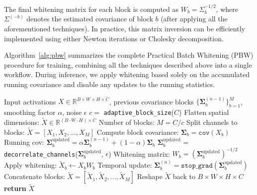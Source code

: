 The final whitening matrix for each block is computed as $W_b = \Sigma_b^{-1/2}$, where $\Sigma^{(-b)}$ denotes the estimated covariance of block $b$ (after applying all the aforementioned techniques).  
In practice, this matrix inversion can be efficiently implemented using either Newton iterations or Cholesky decomposition.

Algorithm~\ref{alg:pbw} summarizes the complete Practical Batch Whitening (PBW) procedure for training, combining all the techniques described above into a single workflow.
During inference, we apply whitening based solely on the accumulated running covariance and disable any updates to the running statistics.

\begin{algorithm}[tb]
\caption{Practical Batch Whitening (PBW)}
\label{alg:pbw}
\begin{algorithmic}
\REQUIRE Input activations $X \in \mathbb{R}^{B \times W \times H \times C}$, 
        previous covariance blocks $\{\boldsymbol{\Sigma}^{(n-1)}_b\}_{b=1}^M$, 
        smoothing factor $\alpha$, noise $\epsilon$
\STATE $c=$ \texttt{adaptive\_block\_size}($C$)
\STATE Flatten spatial dimensions: $\tilde{X} \in \mathbb{R}^{(B \cdot W \cdot H) \times C}$
\STATE Number of blocks: $M = C / c$
\STATE Split channels to blocks: $\tilde{X} = [X_1, X_2, \dots, X_M]$
    \STATE Compute block covariance: $\boldsymbol{\Sigma}_b = \texttt{cov}(X_b)$
    \STATE Running cov: $\boldsymbol{\Sigma}_b^{\text{updated}} = \alpha \boldsymbol{\Sigma}^{(n-1)}_b + (1-\alpha) \boldsymbol{\Sigma}_b$
    \STATE $\boldsymbol{\Sigma}_b^{\text{updated}} $ = \texttt{decorrelate\_channels}($\boldsymbol{\Sigma}_b^{\text{updated}}$, $\epsilon$)
    \STATE Whitening matrix: $W_b = \left(\boldsymbol{\Sigma}_b^{\text{updated}}\right)^{-1/2}$
    \STATE Apply whitening: $\tilde{X}_b \gets X_b W_b$
    \STATE Temporal update: $\boldsymbol{\Sigma}_b^{(n)} = \texttt{stop\_grad} ( \boldsymbol{\Sigma}_b^{\text{updated}} )$
\ENDFOR
\STATE Concatenate blocks: $\tilde{X} = [\tilde{X}_1, \tilde{X}_2, \dots, \tilde{X}_M]$
\STATE Reshape $\tilde{X}$ back to $B \times W \times H \times C$
\STATE \textbf{return} $\tilde{X}$
\end{algorithmic}
\end{algorithm}
